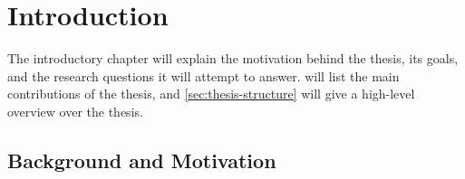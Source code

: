 \chapter{Introduction}
\label{cha:introduction}

\begin{comment}
All chapters should begin with an introduction before any sections, giving an overview of the chapter content.
Each section should in addition start with an introduction before its subsections begin.
Chapters with just one section --- or sections with just one sub-section --- should be avoided.
Think carefully about chapter and section titles as each title stands alone in the table of contents (without associated text)
and should convey the meaning of the contents of the chapter or section.

In all chapters and sections it is important to write clearly and concisely. Avoid repetitions and if needed refer back to the original discussion or presentation.
Each new section, subsection or paragraph should provide the reader with new information and be written in your own words. Avoid direct quotes.
If you use direct quotes, unless the quote itself is very significant, you are conveying to the reader that you are unable to express this discussion or fact yourself.
Such direct quotes also break the flow of the language (yours to someone else's).
\end{comment}

The introductory chapter will explain the motivation behind the thesis, its goals, and the research questions it will attempt to answer.  will list the main contributions of the thesis, and \autoref{sec:thesis-structure} will give a high-level overview over the thesis.

\section{Background and Motivation}
\label{sec:background-and-motivation}

